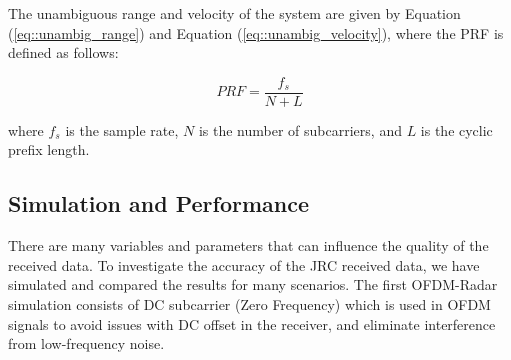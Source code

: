 \documentclass[conference]{IEEEtran}
\begin{document}
  	  	The unambiguous range and velocity of the system are given by Equation (\ref{eq::unambig_range}) and Equation (\ref{eq::unambig_velocity}), where the PRF is defined as follows:
  	  	
  	  	\begin{equation}
  	  		PRF = \frac{f_s}{N + L}
  	  	\end{equation}
  	  	
  	  	where $f_s$ is the sample rate, $N$ is the number of subcarriers, and $L$ is the cyclic prefix length.
  	  	

\subsection {Simulation and Performance}
      
There are many variables and parameters that can influence the quality of the received data. To investigate the accuracy of the JRC received data, we have simulated and compared the results for many scenarios. The first OFDM-Radar simulation consists of DC subcarrier (Zero Frequency) which is used in OFDM signals to avoid issues with DC offset in the receiver, and eliminate interference from low-frequency noise. 
\end{document}
